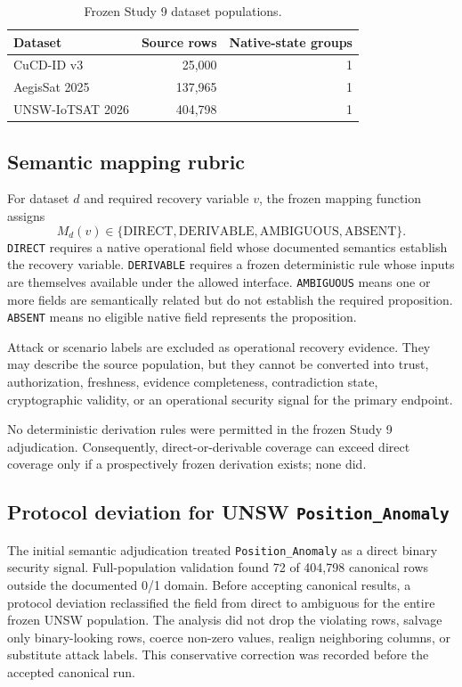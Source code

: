 \documentclass[preprint,12pt]{elsarticle}
\begin{document}
\begin{table}[htbp]
\centering
\caption{Frozen Study 9 dataset populations.}
\label{tab:datasets}
\begin{tabular}{lrr}
\toprule
Dataset & Source rows & Native-state groups \\
\midrule
CuCD-ID v3 & 25,000 & 1 \\
AegisSat 2025 & 137,965 & 1 \\
UNSW-IoTSAT 2026 & 404,798 & 1 \\
\bottomrule
\end{tabular}
\end{table}

\subsection{Semantic mapping rubric}

For dataset $d$ and required recovery variable $v$, the frozen mapping function assigns
\[
M_d(v) \in \{\mathrm{DIRECT},\mathrm{DERIVABLE},\mathrm{AMBIGUOUS},\mathrm{ABSENT}\}.
\]
\texttt{DIRECT} requires a native operational field whose documented semantics establish the recovery variable. \texttt{DERIVABLE} requires a frozen deterministic rule whose inputs are themselves available under the allowed interface. \texttt{AMBIGUOUS} means one or more fields are semantically related but do not establish the required proposition. \texttt{ABSENT} means no eligible native field represents the proposition.

Attack or scenario labels are excluded as operational recovery evidence. They may describe the source population, but they cannot be converted into trust, authorization, freshness, evidence completeness, contradiction state, cryptographic validity, or an operational security signal for the primary endpoint.

No deterministic derivation rules were permitted in the frozen Study 9 adjudication. Consequently, direct-or-derivable coverage can exceed direct coverage only if a prospectively frozen derivation exists; none did.

\subsection{Protocol deviation for UNSW \texttt{Position\_Anomaly}}

The initial semantic adjudication treated \texttt{Position\_Anomaly} as a direct binary security signal. Full-population validation found 72 of 404,798 canonical rows outside the documented 0/1 domain. Before accepting canonical results, a protocol deviation reclassified the field from direct to ambiguous for the entire frozen UNSW population. The analysis did not drop the violating rows, salvage only binary-looking rows, coerce non-zero values, realign neighboring columns, or substitute attack labels. This conservative correction was recorded before the accepted canonical run.
\end{document}
